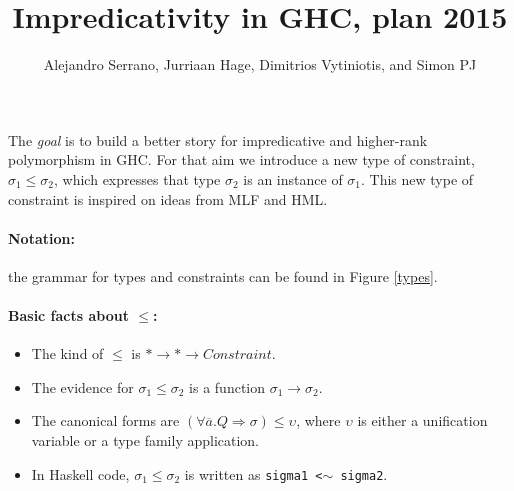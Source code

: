\documentclass[12pt]{article}
\begin{document}
\newcommand{\QQ}{\mathcal{Q}}
\newcommand{\alt}{\; | \;}
\newcommand{\highlighttree}[1]{\begin{center}\colorbox{black!15}{\parbox{0.45\textwidth}{#1}}\end{center}}
\newcommand{\highlight}[1]{\colorbox{black!15}{$\displaystyle #1$}}

\title{Impredicativity in GHC, plan 2015}
\author{Alejandro Serrano, Jurriaan Hage, Dimitrios Vytiniotis, and Simon PJ}
\date{ }
\maketitle

\noindent The \emph{goal} is to build a better story for impredicative and higher-rank polymorphism in GHC. For that aim we introduce a new type of constraint, $\sigma_1 \leq \sigma_2$, which expresses that type $\sigma_2$ is an instance of $\sigma_1$. This new type of constraint is inspired on ideas from MLF and HML.

\paragraph{Notation:} the grammar for types and constraints can be found in Figure \ref{types}.

\paragraph{Basic facts about $\leq$:}
\begin{itemize}
\item The kind of $\leq$ is $* \to * \to Constraint$.
\item The evidence for $\sigma_1 \leq \sigma_2$ is a function $\sigma_1 \to \sigma_2$.
\item The canonical forms are $(\forall \overline{a}. Q \Rightarrow \sigma) \leq \upsilon$, where $\upsilon$ is either a unification variable or a type family application.
\item In Haskell code, $\sigma_1 \leq \sigma_2$ is written as {\tt sigma1 <$\sim$ sigma2}.
\end{itemize}
\end{document}

